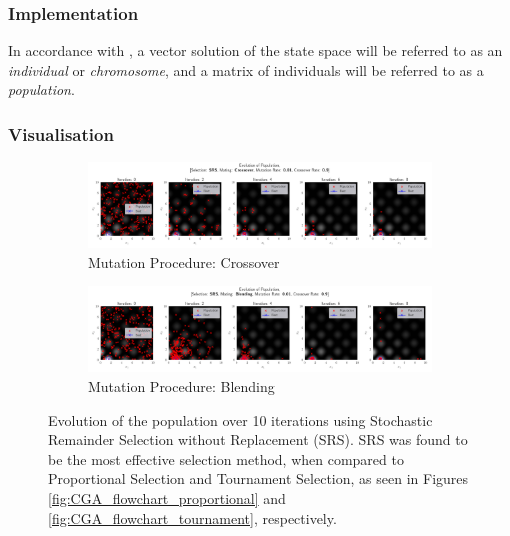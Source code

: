 \documentclass[10pt]{article}
\begin{document}
\begin{multicols}{2}
\subsubsection{Implementation}
\label{sec:CGA_implementation}

In accordance with \cite{parks2023geneticalgorithms}, a vector solution of the state space will be referred to as an \textit{individual} or \textit{chromosome}, and a matrix of individuals will be referred to as a \textit{population}. 

\end{multicols}

\subsubsection{Visualisation}

\begin{figure}[H]
    \centering
    \begin{subfigure}{\textwidth}
        \centering
        \includegraphics[width=\textwidth]{../figures/KBF/10_iters/SRS/Crossover/0.01_0.9_Population.png}
        \caption{Mutation Procedure: Crossover}
        \label{fig:CGA_flowchart_srs_crossover}
    \end{subfigure}
    \begin{subfigure}{\textwidth}
        \centering
        \includegraphics[width=\textwidth]{../figures/KBF/10_iters/SRS/Blending/0.01_0.9_Population.png}
        \caption{Mutation Procedure: Blending}
        \label{fig:CGA_flowchart_srs_blending}
    \end{subfigure}
    \captionsetup{justification=centering}
    \caption{Evolution of the population over 10 iterations using Stochastic Remainder Selection without Replacement (SRS). SRS was found to be the most effective selection method, when compared to Proportional Selection and Tournament Selection, as seen in Figures \ref{fig:CGA_flowchart_proportional} and \ref{fig:CGA_flowchart_tournament}, respectively.}
    \label{fig:CGA_flowchart_srs}
\end{figure}
\end{document}
